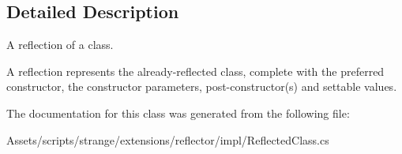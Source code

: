 \subsection{Detailed Description}
A reflection of a class. 

A reflection represents the already-\/reflected class, complete with the preferred constructor, the constructor parameters, post-\/constructor(s) and settable values. 

The documentation for this class was generated from the following file\-:\begin{DoxyCompactItemize}
\item 
Assets/scripts/strange/extensions/reflector/impl/Reflected\-Class.\-cs\end{DoxyCompactItemize}
